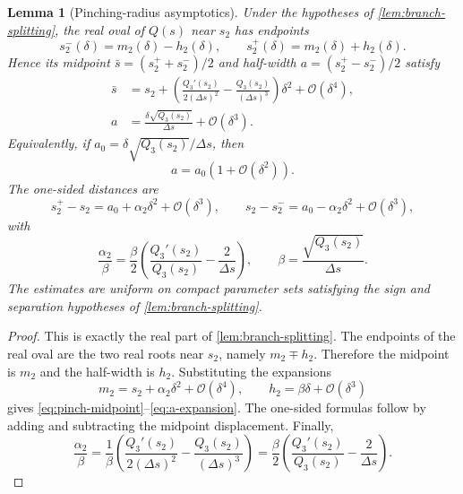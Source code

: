 \documentclass[11pt,a4paper]{article}
\theoremstyle{plain}
\newtheorem{lemma}[theorem]{Lemma}
\theoremstyle{definition}
\theoremstyle{remark}
\newcommand{\Oo}{\mathcal{O}}
\begin{document}
\begin{lemma}[Pinching-radius asymptotics]\label{lem:pinching}
  Under the hypotheses of \cref{lem:branch-splitting}, the real oval
  of $Q(s)$ near $s_2$ has endpoints
  \[
    s_2^-(\delta)=m_2(\delta)-h_2(\delta),
    \qquad
    s_2^+(\delta)=m_2(\delta)+h_2(\delta).
  \]
  Hence its midpoint $\bar s=(s_2^++s_2^-)/2$ and half-width
  $a=(s_2^+-s_2^-)/2$ satisfy
  \begin{align}
    \bar s
    &=
    s_2+
    \left(
      \frac{Q_3'(s_2)}{2(\Delta s)^2}
      -
      \frac{Q_3(s_2)}{(\Delta s)^3}
    \right)\delta^2
    +\Oo(\delta^4),
    \label{eq:pinch-midpoint}\\
    a
    &=
    \frac{\delta\sqrt{Q_3(s_2)}}{\Delta s}
    +\Oo(\delta^3).
    \label{eq:a-expansion}
  \end{align}
  Equivalently, if
  $a_0=\delta\sqrt{Q_3(s_2)}/\Delta s$, then
  \[
    a=a_0(1+\Oo(\delta^2)).
  \]
  The one-sided distances are
  \[
    s_2^+-s_2
    =
    a_0+\alpha_2\delta^2+\Oo(\delta^3),
    \qquad
    s_2-s_2^-
    =
    a_0-\alpha_2\delta^2+\Oo(\delta^3),
  \]
  with
  \[
    \frac{\alpha_2}{\beta}
    =
    \frac{\beta}{2}
    \left(\frac{Q_3'(s_2)}{Q_3(s_2)}-\frac{2}{\Delta s}\right),
    \qquad
    \beta=\frac{\sqrt{Q_3(s_2)}}{\Delta s}.
  \]
  The estimates are uniform on compact parameter sets satisfying the
  sign and separation hypotheses of \cref{lem:branch-splitting}.
\end{lemma}

\begin{proof}
  This is exactly the real part of \cref{lem:branch-splitting}.
  The endpoints of the real oval are the two real roots near $s_2$,
  namely $m_2\mp h_2$.  Therefore the midpoint is $m_2$ and the
  half-width is $h_2$.  Substituting the expansions
  \[
    m_2=s_2+\alpha_2\delta^2+\Oo(\delta^4),
    \qquad
    h_2=\beta\delta+\Oo(\delta^3)
  \]
  gives \eqref{eq:pinch-midpoint}--\eqref{eq:a-expansion}.  The
  one-sided formulas follow by adding and subtracting the midpoint
  displacement.  Finally,
  \[
    \frac{\alpha_2}{\beta}
    =
    \frac{1}{\beta}
    \left(
      \frac{Q_3'(s_2)}{2(\Delta s)^2}
      -
      \frac{Q_3(s_2)}{(\Delta s)^3}
    \right)
    =
    \frac{\beta}{2}
    \left(\frac{Q_3'(s_2)}{Q_3(s_2)}-\frac{2}{\Delta s}\right).
  \]
\end{proof}
\end{document}
